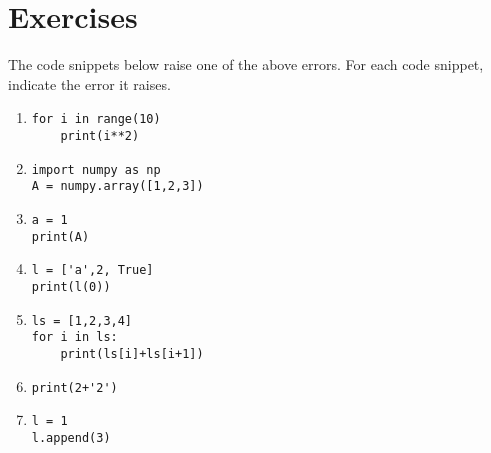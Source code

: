 \documentclass{article}
\begin{document}
\section{Exercises}
The code snippets below raise one of the above errors. For each code snippet, indicate the error it raises.

\begin{enumerate}
    \item \begin{lstlisting}
for i in range(10)
    print(i**2)
    \end{lstlisting}
    
    \item \begin{lstlisting}
import numpy as np
A = numpy.array([1,2,3])
    \end{lstlisting}
    
    \item \begin{lstlisting}
a = 1
print(A)
    \end{lstlisting}
    
\item \begin{lstlisting}
l = ['a',2, True]
print(l(0))
\end{lstlisting}

\item \begin{lstlisting}
ls = [1,2,3,4]
for i in ls:
    print(ls[i]+ls[i+1])
\end{lstlisting}

\item \begin{lstlisting}
print(2+'2')
\end{lstlisting}


\item \begin{lstlisting}
l = 1
l.append(3)
\end{lstlisting}
\end{enumerate}
\end{document}

